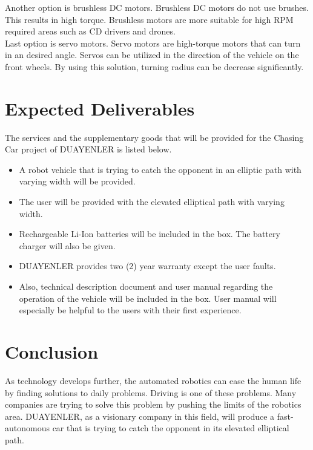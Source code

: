 \documentclass[a4paper,12pt]{article}
\begin{document}
Another option is brushless DC motors. Brushless DC motors do not use brushes. This results in high torque. Brushless motors are more suitable for high RPM required areas such as CD drivers and drones.\\

Last option is servo motors. Servo motors are high-torque motors that can turn in an desired angle. Servos can be utilized in the direction of the vehicle on the front wheels. By using this solution, turning radius can be decrease significantly.\\

\section{Expected Deliverables}

The services and the supplementary goods that will be provided for the Chasing Car project of DUAYENLER is  listed below.
\begin{itemize}
	\item A robot vehicle that is trying to catch the opponent in an elliptic path with varying width will be provided.
	\item The user will be provided with the elevated elliptical path with varying width.
	\item Rechargeable Li-Ion batteries will be included in the box. The battery charger will also be given.
	\item DUAYENLER provides two (2) year warranty except the user faults.
	\item Also, technical description document and user  manual regarding the operation of the vehicle will be included in the box. User manual will especially be helpful to the users with their first experience.
\end{itemize} 

\newpage

\section{Conclusion}
As technology develops further, the automated robotics can ease the human life by finding solutions to daily problems. Driving is one of these problems. Many companies are trying to solve this problem by pushing the limits of the robotics area. DUAYENLER, as a visionary company in this field, will produce a fast-autonomous car that is trying to catch the opponent in its elevated elliptical path.\\
\end{document}
